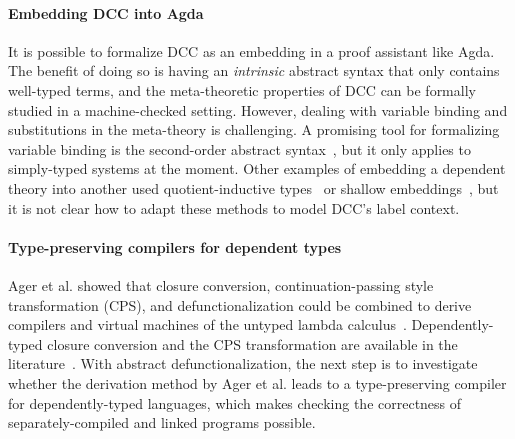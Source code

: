 \paragraph{Embedding DCC into Agda}
It is possible to formalize DCC as an embedding in a proof assistant like Agda. The benefit of doing so is having an \textit{intrinsic} abstract syntax that only contains well-typed terms, and the meta-theoretic properties of DCC can be formally studied in a machine-checked setting. 
However, dealing with variable binding and substitutions in the meta-theory is challenging. A promising tool for formalizing variable binding is the second-order abstract syntax~\cite{DBLP:journals/pacmpl/FioreS22}, but it only applies to simply-typed systems at the moment. Other examples of embedding a dependent theory into another used quotient-inductive types~\cite{DBLP:conf/popl/AltenkirchK16} or shallow embeddings~\cite{DBLP:journals/corr/abs-1907-07562}, but it is not clear how to adapt these methods to model DCC's label context. 

\paragraph{Type-preserving compilers for dependent types} 
Ager et al. showed that closure conversion, continuation-passing style transformation (CPS), and defunctionalization could be combined to derive compilers and virtual machines of the untyped lambda calculus~\cite{ager2003interpreter}.
Dependently-typed closure conversion and the CPS transformation are available in the literature~\cite{DBLP:journals/pacmpl/BowmanCRA18,DBLP:conf/pldi/BowmanA18}. With abstract defunctionalization, the next step is to investigate whether the derivation method by Ager et al. leads to a type-preserving compiler for dependently-typed languages, which makes checking the correctness of separately-compiled and linked programs possible.

